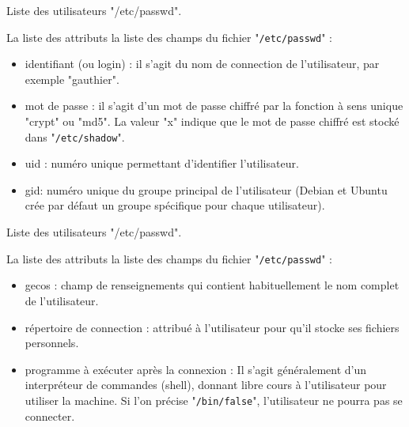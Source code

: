\documentclass[10pt]{beamer}
\begin{document}
\begin{frame}{Liste des utilisateurs "/etc/passwd".}
\begin{alertblock}{La liste des attributs}
la liste des champs du fichier "\texttt{/etc/passwd}" :
\begin{itemize}
\item \alert{identifiant (ou login)} : il s'agit du nom de connection de l'utilisateur, par exemple "gauthier".
\item \alert{mot de passe} : il s'agit d'un mot de passe chiffré par la fonction à sens unique "\alert{crypt}" ou "\alert{md5}". La valeur "\alert{x}" indique que le mot de passe chiffré est stocké dans "\texttt{/etc/shadow}".
\item \alert{uid} : numéro unique permettant d'identifier l'utilisateur.
\item \alert{gid}: numéro unique du groupe principal de l'utilisateur (Debian et Ubuntu crée par défaut un groupe spécifique pour chaque utilisateur).
\end{itemize}
\end{alertblock}
\end{frame}

\begin{frame}{Liste des utilisateurs "/etc/passwd".}
\begin{alertblock}{La liste des attributs}
la liste des champs du fichier "\texttt{/etc/passwd}" :
\begin{itemize}
\item \alert{gecos} : champ de renseignements qui contient habituellement le nom complet de l'utilisateur.
\item \alert{répertoire de connection} : attribué à l'utilisateur pour qu'il stocke ses fichiers personnels.
\item \alert{programme à exécuter après la connexion} : Il s'agit généralement d'un interpréteur de commandes (shell), donnant libre cours à l'utilisateur pour utiliser la machine. Si l'on précise "\texttt{/bin/false}", l'utilisateur ne pourra pas se connecter.
\end{itemize}
\end{alertblock}
\end{frame}
\end{document}
